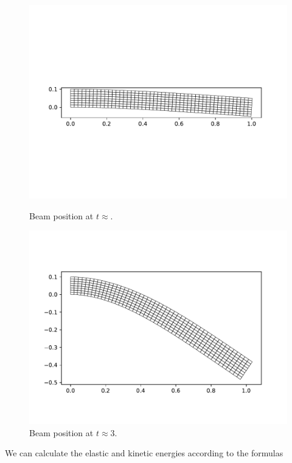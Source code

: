 \documentclass{report}
\begin{document}
\begin{figure}[h]
\centering
\begin{minipage}[t]{0.45\textwidth}
\centering
\includegraphics[width=\textwidth]{../Plots/Project3_main/Figure_10.pdf}
\caption{Beam position at $t\approx$.}
\label{pl:beam_soln_position2}
\end{minipage}
\hfill
\begin{minipage}[t]{0.45\textwidth}
\centering
\includegraphics[width=\textwidth]{../Plots/Project3_main/Figure_12.pdf}
\caption{Beam position at $t\approx3$.}
\label{pl:beam_soln_position3}
\end{minipage}

\end{figure} We can calculate the elastic and kinetic energies according to the formulas
\end{document}
